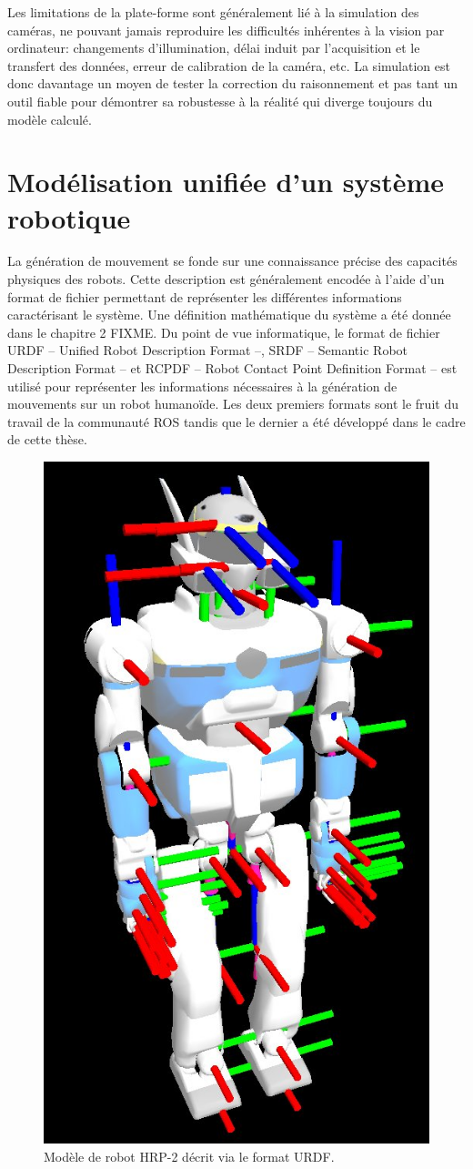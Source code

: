 Les limitations de la plate-forme sont généralement lié à la
simulation des caméras, ne pouvant jamais reproduire les difficultés
inhérentes à la vision par ordinateur: changements d'illumination,
délai induit par l'acquisition et le transfert des données, erreur de
calibration de la caméra, etc. La simulation est donc davantage un
moyen de tester la correction du raisonnement et pas tant un outil
fiable pour démontrer sa robustesse à la réalité qui diverge toujours
du modèle calculé.


\section{Modélisation unifiée d'un système robotique}


La génération de mouvement se fonde sur une connaissance précise des
capacités physiques des robots. Cette description est généralement
encodée à l'aide d'un format de fichier permettant de représenter les
différentes informations caractérisant le système. Une définition
mathématique du système a été donnée dans le chapitre 2 FIXME. Du
point de vue informatique, le format de fichier URDF -- Unified Robot
Description Format --, SRDF -- Semantic Robot Description Format -- et
RCPDF -- Robot Contact Point Definition Format -- est utilisé pour
représenter les informations nécessaires à la génération de mouvements
sur un robot humanoïde. Les deux premiers formats sont le fruit du
travail de la communauté ROS tandis que le dernier a été développé
dans le cadre de cette thèse.

\begin{figure}
  \begin{center}
    \includegraphics[width=.45\linewidth]{src/chap4-integration/hrp2_urdf.jpg}
  \end{center}
  \caption{Modèle de robot HRP-2 décrit via le format URDF.}
\end{figure}



